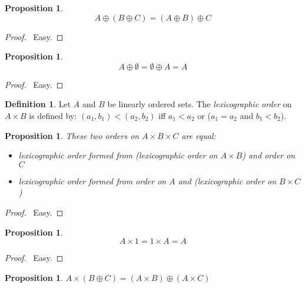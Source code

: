 \documentclass{article}
\let\qed\relax
\newtheorem{proposition}[axiom]{Proposition}
\theoremstyle{definition}
\newtheorem{definition}[axiom]{Definition}
\begin{document}
    \begin{proposition}
        \[ A \oplus (B \oplus C) = (A \oplus B) \oplus C \]
    \end{proposition}

    \begin{proof}
        \pf\ Easy. \qed
    \end{proof}

    \begin{proposition}
        \[ A \oplus \emptyset = \emptyset \oplus A = A \]
    \end{proposition}

    \begin{proof}
        \pf\ Easy. \qed
    \end{proof}

    \begin{definition}
        Let $A$ and $B$ be linearly ordered sets. The \emph{lexicographic order} on $A \times B$ is
        defined by: $(a_1,b_1) < (a_2,b_2)$ iff $a_1 < a_2$ or ($a_1 = a_2$ and $b_1 < b_2$).
    \end{definition}

    \begin{proposition}
        These two orders on $A \times B \times C$ are equal:
        \begin{itemize}
            \item lexicographic order formed from (lexicographic order on $A \times B$) and order on $C$
            \item lexicographic order formed from order on $A$ and (lexicographic order on $B \times C$)
        \end{itemize}
    \end{proposition}

    \begin{proof}
        \pf\ Easy. \qed
    \end{proof}

    \begin{proposition}
        \[ A \times 1 = 1 \times A = A \]
    \end{proposition}

    \begin{proof}
        \pf\ Easy. \qed
    \end{proof}

    \begin{proposition}
        $A \times (B \oplus C) = (A \times B) \oplus (A \times C)$
    \end{proposition}
\end{document}
